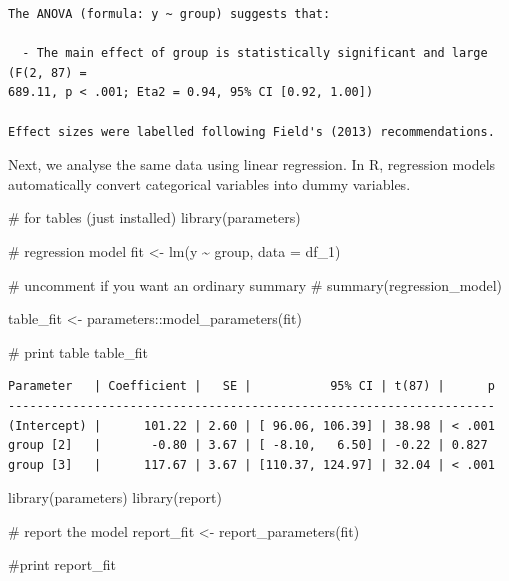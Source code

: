 \documentclass[
  singlecolumn]{article}
\newenvironment{Shaded}{}{}
\newcommand{\AttributeTok}[1]{\textcolor[rgb]{0.84,0.23,0.29}{#1}}
\newcommand{\CommentTok}[1]{\textcolor[rgb]{0.42,0.45,0.49}{#1}}
\newcommand{\FunctionTok}[1]{\textcolor[rgb]{0.44,0.26,0.76}{#1}}
\newcommand{\NormalTok}[1]{\textcolor[rgb]{0.14,0.16,0.18}{#1}}
\newcommand{\OtherTok}[1]{\textcolor[rgb]{0.44,0.26,0.76}{#1}}
\newcommand{\SpecialCharTok}[1]{\textcolor[rgb]{0.00,0.36,0.77}{#1}}
\theoremstyle{definition}
\theoremstyle{remark}
\begin{document}
\begin{verbatim}
The ANOVA (formula: y ~ group) suggests that:

  - The main effect of group is statistically significant and large (F(2, 87) =
689.11, p < .001; Eta2 = 0.94, 95% CI [0.92, 1.00])

Effect sizes were labelled following Field's (2013) recommendations.
\end{verbatim}

Next, we analyse the same data using linear regression. In R, regression
models automatically convert categorical variables into dummy variables.

\begin{Shaded}
\begin{Highlighting}[]
\CommentTok{\# for tables (just installed)}
\FunctionTok{library}\NormalTok{(parameters)}

\CommentTok{\# regression model }
\NormalTok{fit }\OtherTok{\textless{}{-}} \FunctionTok{lm}\NormalTok{(y }\SpecialCharTok{\textasciitilde{}}\NormalTok{ group, }\AttributeTok{data =}\NormalTok{ df\_1)}

\CommentTok{\# uncomment if you want an ordinary summary}
\CommentTok{\# summary(regression\_model)}

\NormalTok{table\_fit }\OtherTok{\textless{}{-}}\NormalTok{ parameters}\SpecialCharTok{::}\FunctionTok{model\_parameters}\NormalTok{(fit)}

\CommentTok{\# print table}
\NormalTok{table\_fit}
\end{Highlighting}
\end{Shaded}

\begin{verbatim}
Parameter   | Coefficient |   SE |           95% CI | t(87) |      p
--------------------------------------------------------------------
(Intercept) |      101.22 | 2.60 | [ 96.06, 106.39] | 38.98 | < .001
group [2]   |       -0.80 | 3.67 | [ -8.10,   6.50] | -0.22 | 0.827 
group [3]   |      117.67 | 3.67 | [110.37, 124.97] | 32.04 | < .001
\end{verbatim}

\begin{Shaded}
\begin{Highlighting}[]
\FunctionTok{library}\NormalTok{(parameters)}
\FunctionTok{library}\NormalTok{(report)}

\CommentTok{\# report the model}
\NormalTok{report\_fit }\OtherTok{\textless{}{-}} \FunctionTok{report\_parameters}\NormalTok{(fit)}

\CommentTok{\#print}
\NormalTok{report\_fit}
\end{Highlighting}
\end{Shaded}
\end{document}
